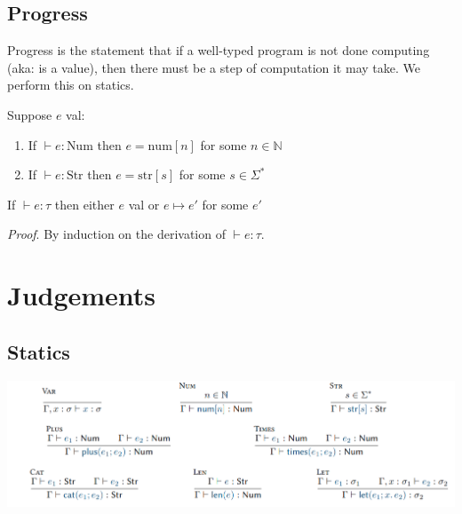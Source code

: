 \documentclass[11pt,a4paper,titlepage,dvipsnames,cmyk]{scrartcl}
\begin{document}
\subsection{Progress}
Progress is the statement that if a well-typed program is not done computing (aka: is a value), then there must be a step of computation it may take. We perform this on statics.

\begin{tcolorbox} [space to upper,
collower=white,
title={Lemma 4 (Canonical Forms)},
nobeforeafter,
halign lower=flush right, ]
Suppose $e$ val:
\begin{enumerate}
\item If $\vdash e : \text{Num}$ then $e = \text{num}[n]$ for some $n \in \mathbb{N}$
\item If $\vdash e : \text{Str}$ then $e = \text{str}[s]$ for some $s \in \Sigma^*$
\end{enumerate}
\end{tcolorbox}

\begin{tcolorbox} [space to upper,
collower=white,
title={Theorem 4 (Progress)},
nobeforeafter,
halign lower=flush right, ]
If $\vdash e : \tau$ then either $e$ val or $e \mapsto e'$ for some $e'$

\textit{Proof}. By induction on the derivation of $\vdash e : \tau$. 
\end{tcolorbox}



\newpage
\section{Judgements}
\subsection{Statics}
\begin{center}
\includegraphics[width=\textwidth]{pics/static-judgement.png}
\end{center}
\end{document}
